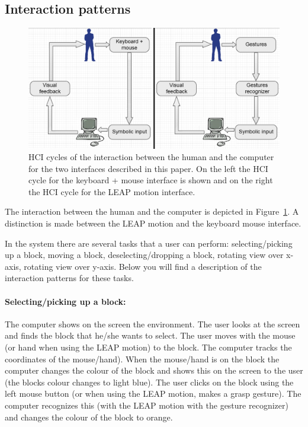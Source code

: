 \subsection{Interaction patterns}

\begin{figure}[H]
\includegraphics[width=\textwidth]{imgs/HCIcycles.png}
\caption{\label{fig:HCIcycles}HCI cycles of the interaction between the human and the computer for the two interfaces described in this paper. On the left the HCI cycle for the keyboard + mouse interface is shown and on the right the HCI cycle for the LEAP motion interface.}
\end{figure}

The interaction between the human and the computer is depicted in Figure~\ref{fig:HCIcycles}. A distinction is made between the LEAP motion and the keyboard mouse interface. 

In the system there are several tasks that a user can perform: selecting/picking up a block, moving a block, deselecting/dropping a block, rotating view over x-axis, rotating view over y-axis. Below you will find a description of the interaction patterns for these tasks.

\paragraph{Selecting/picking up a block:} The computer shows on the screen the environment. The user looks at the screen and finds the block that he/she wants to select. The user moves with the mouse (or hand when using the LEAP motion) to the block. The computer tracks the coordinates of the mouse/hand). When the mouse/hand is on the block the computer changes the colour of the block and shows this on the screen to the user (the blocks colour changes to light blue). The user clicks on the block using the left mouse button (or when using the LEAP motion, makes a grasp gesture). The computer recognizes this (with the LEAP motion with the gesture recognizer) and changes the colour of the block to orange.
